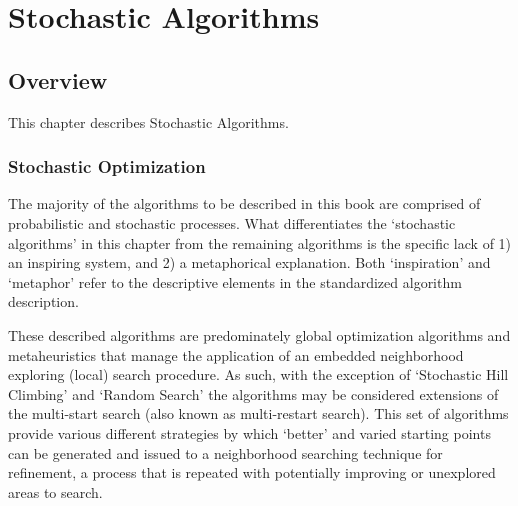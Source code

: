 

\renewcommand{\bibsection}{\subsection{\bibname}}

\chapter{Stochastic Algorithms}
\label{ch:stochastic}

%
%
\section{Overview}
This chapter describes Stochastic Algorithms.

\subsection{Stochastic Optimization}
The majority of the algorithms to be described in this book are comprised of probabilistic and stochastic processes. What differentiates the `stochastic algorithms' in this chapter from the remaining algorithms is the specific lack of 1) an inspiring system, and 2) a metaphorical explanation. Both `inspiration' and `metaphor' refer to the descriptive elements in the standardized algorithm description.

These described algorithms are predominately global optimization algorithms and metaheuristics that manage the application of an embedded neighborhood exploring (local) search procedure. As such, with the exception of `Stochastic Hill Climbing' and `Random Search' the algorithms may be considered extensions of the multi-start search (also known as multi-restart search). This set of algorithms provide various different strategies by which `better' and varied starting points can be generated and issued to a neighborhood searching technique for refinement, a process that is repeated with potentially improving or unexplored areas to search.

